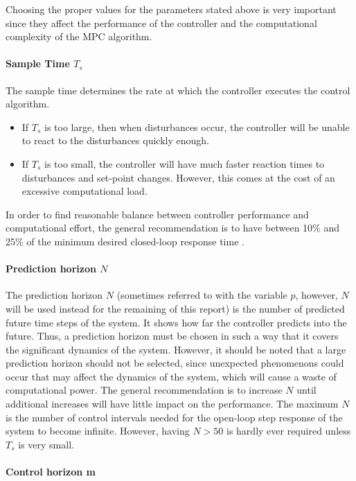 \documentclass{thesisreport}
\begin{document}
\noindent Choosing the proper values for the parameters stated above is very important since they affect the performance of the controller and the computational complexity of the MPC algorithm.

\paragraph{Sample Time $T_s$} 

The sample time determines the rate at which the controller executes the control algorithm. \begin{itemize}
	\item If $T_s$ is too large, then when disturbances occur, the controller will be unable to react to the disturbances quickly enough.
	\item If $T_s$ is too small, the controller will have much faster reaction times to disturbances and set-point changes. However, this comes at the cost of an excessive computational load.
\end{itemize}

\noindent In order to find reasonable balance between controller performance and computational effort, the general recommendation is to have between 10\% and 25\% of the minimum desired closed-loop response time .

\paragraph{Prediction horizon $N$} 

The prediction horizon $N$ (sometimes referred to with the variable $p$, however, $N$ will be used instead for the remaining of this report) is the number of predicted future time steps of the system. It shows how far the controller predicts into the future. Thus, a prediction horizon must be chosen in such a way that it covers the significant dynamics of the system. However, it should be noted that a large prediction horizon should not be selected, since unexpected phenomenons could occur that may affect the dynamics of the system, which will cause a waste of computational power. The general recommendation is to increase $N$ until additional increases will have little impact on the performance. The maximum $N$ is the number of control intervals needed for the open-loop step response of the system to become infinite. However, having $N>50$ is hardly ever required unless $T_s$ is very small.

\paragraph{Control horizon m}
\end{document}
